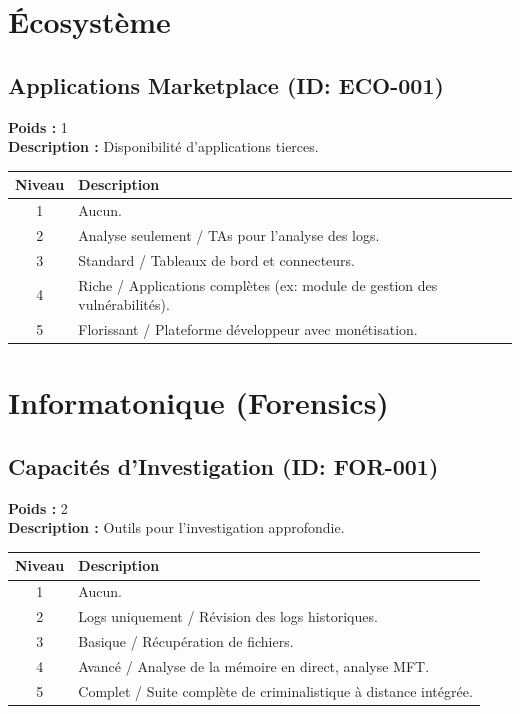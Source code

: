 \documentclass{article}
\begin{document}
\section{Écosystème}
\subsection{Applications Marketplace (ID: ECO-001)}
\textbf{Poids :} 1 \\
\textbf{Description :} Disponibilité d'applications tierces.
\vspace{0.3cm}
\begin{longtable}{|c|p{12cm}|}
\hline
\rowcolor{lightgray} \textbf{Niveau} & \textbf{Description} \\ \hline
1 & Aucun. \\ \hline
2 & Analyse seulement / TAs pour l'analyse des logs. \\ \hline
3 & Standard / Tableaux de bord et connecteurs. \\ \hline
4 & Riche / Applications complètes (ex: module de gestion des vulnérabilités). \\ \hline
5 & Florissant / Plateforme développeur avec monétisation. \\ \hline
\end{longtable}
\vspace{0.5cm}
\section{Informatonique (Forensics)}
\subsection{Capacités d'Investigation (ID: FOR-001)}
\textbf{Poids :} 2 \\
\textbf{Description :} Outils pour l'investigation approfondie.
\vspace{0.3cm}
\begin{longtable}{|c|p{12cm}|}
\hline
\rowcolor{lightgray} \textbf{Niveau} & \textbf{Description} \\ \hline
1 & Aucun. \\ \hline
2 & Logs uniquement / Révision des logs historiques. \\ \hline
3 & Basique / Récupération de fichiers. \\ \hline
4 & Avancé / Analyse de la mémoire en direct, analyse MFT. \\ \hline
5 & Complet / Suite complète de criminalistique à distance intégrée. \\ \hline
\end{longtable}
\vspace{0.5cm}
\end{document}

